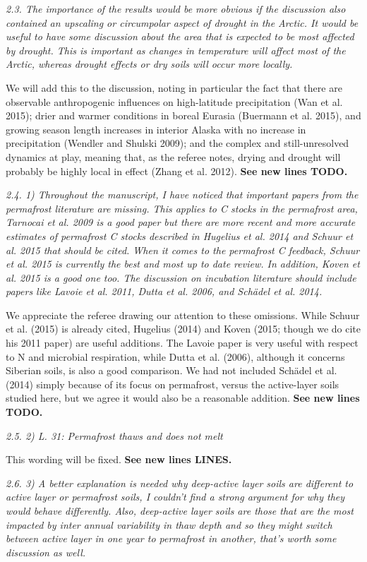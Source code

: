 \documentclass[11pt, oneside]{article}
\begin{document}
\medskip
{\it 2.3. The importance of the results would be more obvious if the discussion also contained an upscaling or circumpolar aspect of drought in the Arctic. It would be useful to have some discussion about the area that is expected to be most affected by drought. This is important as changes in temperature will affect most of the Arctic, whereas drought effects or dry soils will occur more locally. }

We will add this to the discussion, noting in particular the fact that there are observable anthropogenic influences on high-latitude precipitation (Wan et al. 2015); drier and warmer conditions in boreal Eurasia (Buermann et al. 2015), and growing season length increases in interior Alaska with no increase in precipitation (Wendler and Shulski 2009); and the complex and still-unresolved dynamics at play, meaning that, as the referee notes, drying and drought will probably be highly local in effect (Zhang et al. 2012). {\bf See new lines TODO.}

\medskip
{\it 2.4. 1) Throughout the manuscript, I have noticed that important papers from the permafrost literature are missing. This applies to C stocks in the permafrost area, Tarnocai et al. 2009 is a good paper but there are more recent and more accurate estimates of permafrost C stocks described in Hugelius et al. 2014 and Schuur et al. 2015 that should be cited. When it comes to the permafrost C feedback, Schuur et al. 2015 is currently the best and most up to date review. In addition, Koven et al. 2015 is a good one too. The discussion on incubation literature should include papers like Lavoie et al. 2011, Dutta et al. 2006, and Schädel et al. 2014. }

We appreciate the referee drawing our attention to these omissions. While Schuur et al. (2015) is already cited, Hugelius (2014) and Koven (2015; though we do cite his 2011 paper) are useful additions. The Lavoie paper is very useful with respect to N and microbial respiration, while Dutta et al. (2006), although it concerns Siberian soils, is also a good comparison. We had not included Schädel et al. (2014) simply because of its focus on permafrost, versus the active-layer soils studied here, but we agree it would also be a reasonable addition. {\bf See new lines TODO.}

\medskip
{\it 2.5. 2) L. 31: Permafrost thaws and does not melt }

This wording will be fixed. {\bf See new lines LINES.}

\medskip
{\it 2.6. 3) A better explanation is needed why deep-active layer soils are different to active layer or permafrost soils, I couldn't find a strong argument for why they would behave differently. Also, deep-active layer soils are those that are the most impacted by inter annual variability in thaw depth and so they might switch between active layer in one year to permafrost in another, that's worth some discussion as well. }
\end{document}
